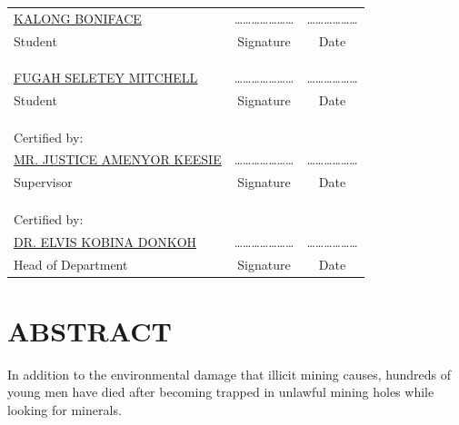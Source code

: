 \documentclass[12pt,a4paper]{book}
\begin{document}
	\begin{center}
	\begin{tabular}{lcc}
		\underline{KALONG BONIFACE} &\quad\quad\quad \ldots\ldots\ldots\ldots\ldots\ldots\ldots &\quad\quad\quad \ldots\ldots\ldots\ldots\ldots\ldots \\
		Student &\quad\quad\quad Signature &\quad\quad\quad Date \\
		& & \\
		& & \\
		& & \\
		\underline{FUGAH SELETEY MITCHELL} &\quad\quad\quad \ldots\ldots\ldots\ldots\ldots\ldots\ldots &\quad\quad\quad \ldots\ldots\ldots\ldots\ldots\ldots \\
		Student &\quad\quad\quad Signature &\quad\quad\quad Date \\
		& & \\
		& & \\
		& & \\
		Certified by: & &\\
		\underline{MR. JUSTICE AMENYOR KEESIE} &\quad\quad\quad \ldots\ldots\ldots\ldots\ldots\ldots\ldots &\quad\quad\quad \ldots\ldots\ldots\ldots\ldots\ldots \\
		Supervisor &\quad\quad\quad Signature &\quad\quad\quad Date \\
		& & \\
		& & \\
		& & \\
		Certified by: & &\\
		\underline{DR. ELVIS KOBINA DONKOH} &\quad\quad\quad \ldots\ldots\ldots\ldots\ldots\ldots\ldots &\quad\quad\quad \ldots\ldots\ldots\ldots\ldots\ldots \\
		Head of Department &\quad\quad\quad Signature &\quad\quad\quad Date
	\end{tabular}
\end{center}
	
	
	\newpage
	\section*{\textbf{ABSTRACT}}
	In addition to the environmental damage that illicit mining causes, hundreds of young men have died after becoming trapped in unlawful mining holes while looking for minerals.
	
\end{document}
